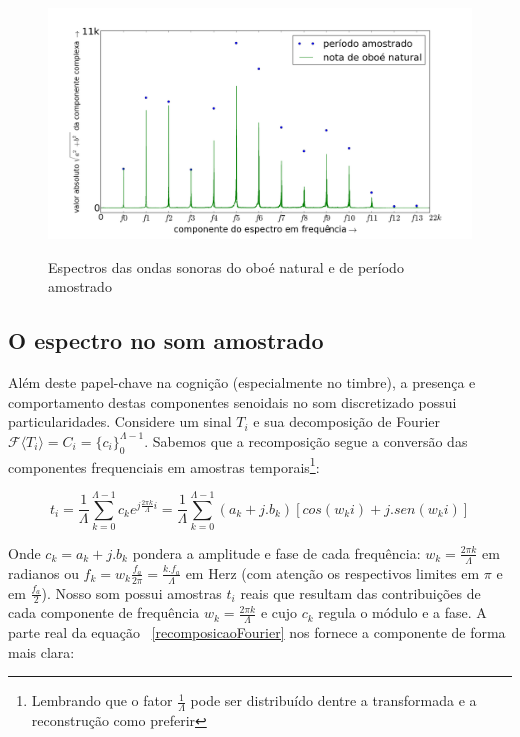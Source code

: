 \begin{figure}[h!]
    \centering
    \caption{Espectros das ondas sonoras do oboé natural e de período amostrado}
        \includegraphics[width=\textwidth]{figuras/espectroOboeAmostradoNatural3}
        \label{fig:espectroOboe}
\end{figure}





\subsection{O espectro no som amostrado}
Além deste papel-chave na cognição (especialmente no timbre), a presença e comportamento destas componentes senoidais 
no som discretizado possui particularidades. Considere um sinal $T_i$ e sua decomposição de Fourier $\mathcal{F}\langle T_i\rangle=C_i=\{c_i\}_0^{\Lambda-1}$. Sabemos que a recomposição segue a conversão das componentes frequenciais em amostras temporais\footnote{Lembrando que o fator $\frac{1}{\Lambda}$ pode ser distribuído dentre a transformada e a reconstrução como preferir}:

 
\begin{equation}\label{recomposicaoFourier}
t_i = \frac{1}{\Lambda}\sum_{k=0}^{\Lambda-1}c_ke^{j \frac{2\pi k}{\Lambda} i } = \frac{1}{\Lambda}\sum_{k=0}^{\Lambda-1}(a_k+ j . b_k)\left[cos(w_k i) +j . sen(w_k i)\right]
\end{equation}

Onde $c_k = a_k + j . b_k$ pondera a amplitude e fase de cada frequência: $w_k=\frac{2\pi k}{\Lambda}$ em radianos ou $f_k=w_k\frac{f_a}{2\pi}=\frac{k.f_a}{\Lambda}$ em Herz (com atenção os respectivos limites em $\pi$ e em $\frac{f_a}{2}$). Nosso som possui amostras $t_i$ reais que resultam das contribuições de cada componente de frequência $w_k=\frac{2\pi k}{\Lambda}$ e cujo $c_k$ regula o módulo e a fase. A parte real da equação ~\ref{recomposicaoFourier} nos fornece a componente de forma mais clara:

